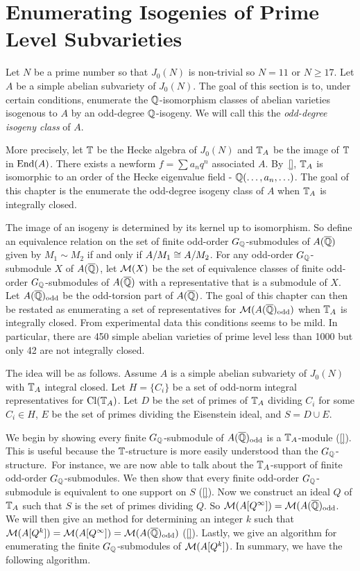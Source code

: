 \documentclass[11pt, proquest]{uwthesis}
\begin{document}
\chapter{Enumerating Isogenies of Prime Level Subvarieties}%
\label{chap:isogeny_class}

Let $N$ be a prime number so that $J_0(N)$ is non-trivial so $N=11$ or $N\geq
17$. Let $A$ be a simple abelian subvariety of $J_0(N)$. The goal of this
section is to, under certain conditions, enumerate the $\mathbb{Q}$-isomorphism
classes of abelian varieties isogenous to $A$ by an odd-degree $\mathbb{Q}$-isogeny.
We will call this the \emph{odd-degree isogeny class} of $A$.

More precisely, let $\mathbb{T}$ be the Hecke algebra of $J_0(N)$ and $\mathbb{T}_A$ be the
image of $\mathbb{T}$ in $\operatorname{End}(A)$. There exists a newform $f=\sum a_n q^n$ associated
$A$. By~\ref{}, $\mathbb{T}_A$ is isomorphic to an order of the Hecke eigenvalue field
- $\mathbb{Q}(\ldots,a_n,\ldots)$. The goal of this chapter is the enumerate the
odd-degree isogeny class of $A$ when $\mathbb{T}_A$ is integrally closed.

The image of an isogeny is determined by its kernel up to isomorphism. So
define an equivalence relation on the set of finite odd-order
$G_{\mathbb{Q}}$-submodules of $A(\overline{\mathbb{Q}})$ given by $M_1\sim M_2$ if and only if
$A/M_1\cong A/M_2$. For any odd-order $G_{\mathbb{Q}}$-submodule $X$ of $A(\overline{\mathbb{Q}})$, let
$\mathcal{M}(X)$ be the set of equivalence classes of finite odd-order
$G_{\mathbb{Q}}$-submodules of $A(\overline{\mathbb{Q}})$ with a representative that is a submodule of
$X$. Let $A(\overline{\mathbb{Q}})_{\mathrm{odd}}$ be the odd-torsion part of $A(\overline{\mathbb{Q}})$. The goal of
this chapter can then be restated as enumerating a set of representatives for
$\mathcal{M}(A(\overline{\mathbb{Q}})_{\mathrm{odd}})$ when $\mathbb{T}_A$ is integrally closed. From experimental data
this conditions seems to be mild. In particular, there are 450 simple abelian
varieties of prime level less than 1000 but only 42 are not integrally closed.

The idea will be as follows. Assume $A$ is a simple abelian subvariety of
$J_0(N)$ with $\mathbb{T}_A$ integral closed. Let $H=\{C_i\}$ be a set of odd-norm
integral representatives for $\operatorname{Cl}(\mathbb{T}_A)$. Let $D$ be the set of primes of
$\mathbb{T}_A$ dividing $C_i$ for some $C_i\in H$, $E$ be the set of primes dividing
the Eisenstein ideal, and $S=D\cup E$.

We begin by showing every
finite $G_{\mathbb{Q}}$-submodule of $A(\overline{\mathbb{Q}})_{\mathrm{odd}}$ is a $\mathbb{T}_A$-module (\ref{}). This
is useful because the $\mathbb{T}$-structure is more easily understood than the
$G_{\mathbb{Q}}$-structure.\ For instance, we are now able to talk about the
$\mathbb{T}_A$-support of finite odd-order $G_{\mathbb{Q}}$-submodules. We then show that every
finite odd-order $G_{\mathbb{Q}}$-submodule is equivalent to one support on $S$
(\ref{}). Now we construct an ideal $Q$ of $\mathbb{T}_A$ such that $S$ is the set of
primes dividing $Q$. So $\mathcal{M}(A[Q^\infty])=\mathcal{M}(A(\overline{\mathbb{Q}})_{\mathrm{odd}}$. We will then give
an method for determining an integer $k$ such that
$\mathcal{M}(A[Q^k])=\mathcal{M}(A[Q^\infty])=\mathcal{M}(A(\overline{\mathbb{Q}})_{\mathrm{odd}})$ (\ref{}). Lastly, we give an
algorithm for enumerating the finite $G_{\mathbb{Q}}$-submodules of $\mathcal{M}(A[Q^k])$. In
summary, we have the following algorithm.
\end{document}
